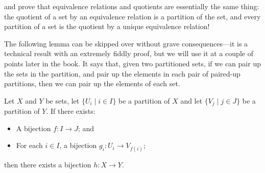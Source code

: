  and  prove that equivalence relations and quotients are essentially the same thing: the quotient of a set by an equivalence relation is a partition of the set, and every partition of a set is the quotient by a unique equivalence relation!

The following lemma can be skipped over without grave consequences---it is a technical result with an extremely fiddly proof, but we will use it at a couple of points later in the book. It says that, given two partitioned sets, if we can pair up the sets in the partition, and pair up the elements in each pair of paired-up partitions, then we can pair up the elements of each set.

\begin{lemma}
\label{lemBijectionBetweenPartitionAndComponentsInducesBijectionOfSets}
Let $X$ and $Y$ be sets, let $\{ U_i \mid i \in I \}$ be a partition of $X$ and let $\{ V_j \mid j \in J \}$ be a partition of $Y$. If there exists:
\begin{itemize}
\item A bijection $f : I \to J$; and
\item For each $i \in I$, a bijection $g_i : U_i \to V_{f(i)}$;
\end{itemize}
then there exists a bijection $h : X \to Y$.
\end{lemma}

